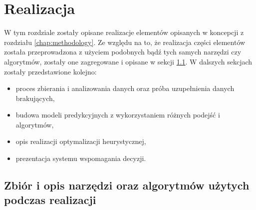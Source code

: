 
\chapter{Realizacja} \label{chap:realization}
W tym rozdziale zostały opisane realizacje elementów opisanych w koncepcji z rozdziału \ref{chap:methodology}. Ze względu na to, że realizacja części elementów została przeprowadzona z użyciem podobnych bądź tych samych narzędzi czy algorytmów, zostały one zagregowane i opisane w sekcji \ref{sec:tools}. W dalszych sekcjach zostały przedstawione kolejno:
\begin{itemize}
    \item proces zbierania i analizowania danych oraz próba uzupełnienia danych brakujących,
    \item budowa modeli predykcyjnych z wykorzystaniem różnych podejść i algorytmów,
    \item opis realizacji optymalizacji heurystycznej,
    \item prezentacja systemu wspomagania decyzji.
\end{itemize}

\section{Zbiór i opis narzędzi oraz algorytmów użytych podczas realizacji}\label{sec:tools}

